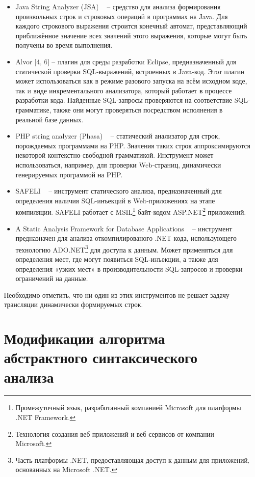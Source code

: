 \documentclass[a5paper]{article}
\begin{document}
\begin{itemize}
    \item Java String Analyzer (JSA) ~\cite{JSA} -- средство для анализа формирования произвольных строк и строковых операций в программах на Java. Для каждого строкового выражения строится конечный автомат, представляющий приближённое значение всех значений этого выражения, которые могут быть получены во время выполнения.
    \item Alvor [4, 6] -- плагин для среды разработки Eclipse, предназначенный для статической проверки SQL-выражений, встроенных в Java-код. Этот плагин может использоваться как в режиме разового запуска на всём исходном коде, так и виде инкрементального анализатора, который работает в процессе разработки кода. Найденные SQL-запросы проверяются на соответствие SQL-грамматике, также они могут проверяться посредством исполнения в реальной базе данных.
    \item PHP string analyzer (Phasa) ~\cite{PHPSA} -- статический анализатор для строк, порождаемых программами на PHP. Значения таких строк аппроксимируются некоторой контекстно-свободной грамматикой. Инструмент может  использоваться, например,  для проверки Web-страниц, динамически генерируемых программой на  PHP.
    \item SAFELI ~\cite{SAForInject} -- инструмент статического анализа, предназначенный для определения наличия SQL-инъекций в Web-приложениях на этапе компиляции. SAFELI работает с MSIL\footnote{Промежуточный язык, разработанный компанией Microsoft для платформы .NET Framework.} байт-кодом ASP.NET\footnote{Технология создания веб-приложений и веб-сервисов от компании Microsoft.} приложений.
    \item A Static Analysis Framework for Database Applications ~\cite{StringExpr} -- инструмент предназначен для анализа откомпилированого .NET-кода, использующего технологию ADO.NET\footnote{ Часть платформы .NET, предоставляющая доступ к данным для приложений, основанных на Microsoft .NET.} для доступа к данным. Может применяться для определения мест, где могут появиться SQL-инъекции, а также для определения «узких мест» в производительности SQL-запросов и проверки ограничений на данные.
\end{itemize}

Необходимо отметить, что ни один из этих инструментов   не решает задачу трансляции  динамически формируемых строк.


\section{ Модификации алгоритма абстрактного синтаксического анализа}
\end{document}

